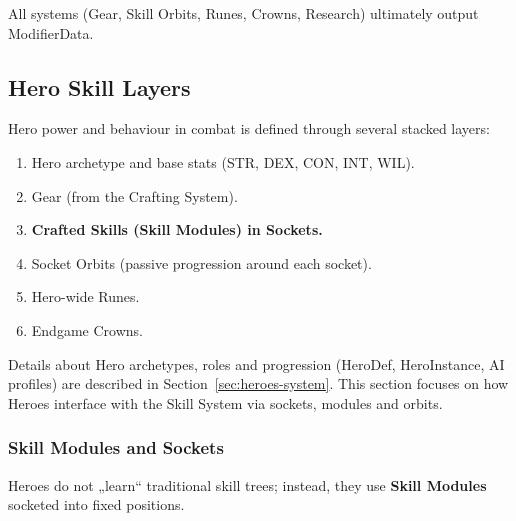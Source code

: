All systems (Gear, Skill Orbits, Runes, Crowns, Research) ultimately output ModifierData.

\subsection{Hero Skill Layers}

Hero power and behaviour in combat is defined through several stacked layers:

\begin{enumerate}
	\item Hero archetype and base stats (STR, DEX, CON, INT, WIL).
	\item Gear (from the Crafting System).
	\item \textbf{Crafted Skills (Skill Modules) in Sockets.}
	\item Socket Orbits (passive progression around each socket).
	\item Hero-wide Runes.
	\item Endgame Crowns.
\end{enumerate}

Details about Hero archetypes, roles and progression (HeroDef, HeroInstance, AI profiles) are described in Section~\ref{sec:heroes-system}. 
This section focuses on how Heroes interface with the Skill System via sockets, modules and orbits.


\subsubsection{Skill Modules and Sockets}

Heroes do not „learn“ traditional skill trees; instead, they use \textbf{Skill Modules} socketed into fixed positions.

